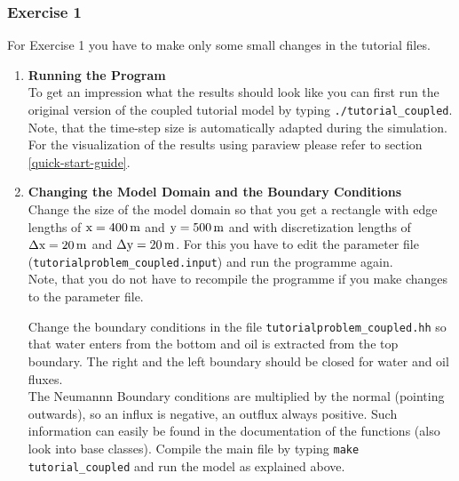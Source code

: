 \subsubsection{Exercise 1}
\renewcommand{\labelenumi}{\alph{enumi})} For Exercise 1 you have
to make only some small changes in the tutorial files.  

\begin{enumerate}

\item \textbf{Running the Program} \\
  To get an impression what the results should look like you can first run the original version of 
the coupled tutorial model by typing  \texttt{./tutorial\_coupled}. 
Note, that the time-step size is automatically adapted during the simulation. 
For the visualization of the results using paraview please refer to section \ref{quick-start-guide}.


\item \textbf{Changing the Model Domain and the Boundary Conditions} \\
  Change the size of the model domain so that you get a rectangle with
  edge lengths of $\text{x} = \unit[400]{m}$ and $\text{y} = \unit[500]{m}$ and with
  discretization lengths of $\Delta \text{x} = \unit[20]{m}$ and $\Delta
  \text{y} = \unit[20]{m}$. For this you have to edit the parameter file (\texttt{tutorialproblem\_coupled.input}) 
  and run the programme again.\\
  Note, that you do not have to recompile the programme if you make changes to the parameter file.

  
  Change the boundary conditions in the file
  \texttt{tutorialproblem\_coupled.hh} so that water enters from the
  bottom and oil is extracted from the top boundary. The right and the
  left boundary should be closed for water and oil fluxes. \\
  The Neumannn Boundary conditions are multiplied by the normal (pointing outwards), so an influx is negative, an outflux always positive. 
  Such information can easily be found in the documentation of the functions (also look into base classes).
  Compile the main file by typing \texttt{make tutorial\_coupled} and
  run the model as explained above.


\end{enumerate}
